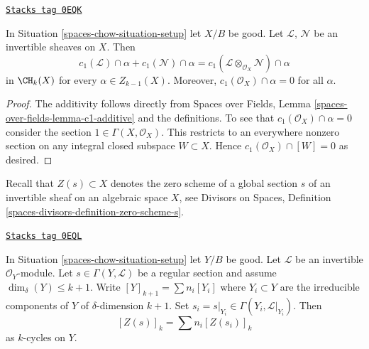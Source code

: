 \begin{lemma}
\label{spaces-chow-lemma-c1-cap-additive}
\href{https://stacks.math.columbia.edu/tag/0EQK}{\texttt{Stacks tag 0EQK}}

In Situation \ref{spaces-chow-situation-setup} let $X/B$ be good.
Let $\mathcal{L}$, $\mathcal{N}$ be an invertible sheaves on $X$.
Then
$$
c_1(\mathcal{L}) \cap \alpha  + c_1(\mathcal{N}) \cap \alpha =
c_1(\mathcal{L} \otimes_{\mathcal{O}_X} \mathcal{N}) \cap \alpha
$$
in $\CH_k(X)$ for every $\alpha \in Z_{k - 1}(X)$. Moreover,
$c_1(\mathcal{O}_X) \cap \alpha = 0$ for all $\alpha$.
\end{lemma}

\begin{proof}
The additivity follows directly from
Spaces over Fields, Lemma \ref{spaces-over-fields-lemma-c1-additive}
and the definitions. To see that $c_1(\mathcal{O}_X) \cap \alpha = 0$
consider the section $1 \in \Gamma(X, \mathcal{O}_X)$. This restricts
to an everywhere nonzero section on any integral closed subspace
$W \subset X$. Hence $c_1(\mathcal{O}_X) \cap [W] = 0$ as desired.
\end{proof}

Recall that $Z(s) \subset X$ denotes the zero scheme of a global section
$s$ of an invertible sheaf on an algebraic space $X$, see
Divisors on Spaces, Definition \ref{spaces-divisors-definition-zero-scheme-s}.

\begin{lemma}
\label{spaces-chow-lemma-prepare-geometric-cap}
\href{https://stacks.math.columbia.edu/tag/0EQL}{\texttt{Stacks tag 0EQL}}

In Situation \ref{spaces-chow-situation-setup} let $Y/B$ be good.
Let $\mathcal{L}$ be an invertible $\mathcal{O}_Y$-module.
Let $s \in \Gamma(Y, \mathcal{L})$ be a regular section and
assume $\dim_\delta(Y) \leq k + 1$.
Write $[Y]_{k + 1} = \sum n_i[Y_i]$ where $Y_i \subset Y$ are the
irreducible components of $Y$ of $\delta$-dimension $k + 1$.
Set $s_i = s|_{Y_i} \in \Gamma(Y_i, \mathcal{L}|_{Y_i})$. Then
\begin{equation}
\label{equation-equal-as-cycles}
[Z(s)]_k =  \sum n_i[Z(s_i)]_k
\end{equation}
as $k$-cycles on $Y$.
\end{lemma}

